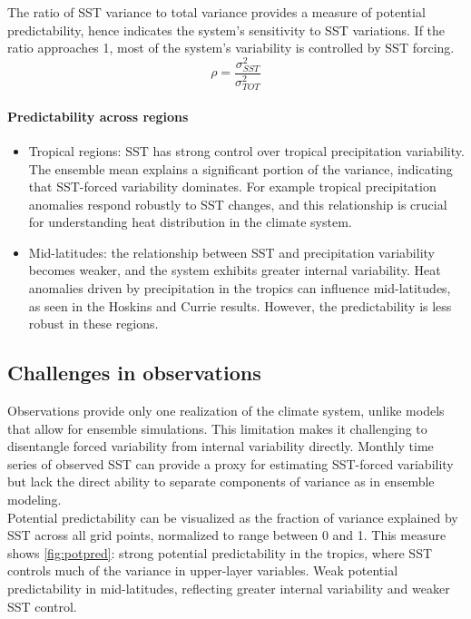 The ratio of SST variance to total variance provides a measure of potential predictability, hence indicates the system's sensitivity to SST variations. If the ratio approaches 1, most of the system's variability is controlled by SST forcing.
\begin{equation}\label{eq.pot predictability}
	\rho=\frac{\sigma^2_{SST}}{\sigma^2_{TOT}}
\end{equation}
\paragraph{Predictability across regions}
\begin{itemize}
	\item Tropical regions: SST has strong control over tropical precipitation variability.
	      The ensemble mean explains a significant portion of the variance, indicating that SST-forced variability dominates. For example tropical precipitation anomalies respond robustly to SST changes, and this relationship is crucial for understanding heat distribution in the climate system.
	\item Mid-latitudes: the relationship between SST and precipitation variability becomes weaker, and the system exhibits greater internal variability.
	      Heat anomalies driven by precipitation in the tropics can influence mid-latitudes, as seen in the Hoskins and Currie results. However, the predictability is less robust in these regions.
\end{itemize}
\subsection{Challenges in observations}
Observations provide only one realization of the climate system, unlike models that allow for ensemble simulations. This limitation makes it challenging to disentangle forced variability from internal variability directly. Monthly time series of observed SST can provide a proxy for estimating SST-forced variability but lack the direct ability to separate components of variance as in ensemble modeling.\\




Potential predictability can be visualized as the fraction of variance explained by SST across all grid points, normalized to range between 0 and 1. This measure shows \ref{fig:potpred}: strong potential predictability in the tropics, where SST controls much of the variance in upper-layer variables.
Weak potential predictability in mid-latitudes, reflecting greater internal variability and weaker SST control.

